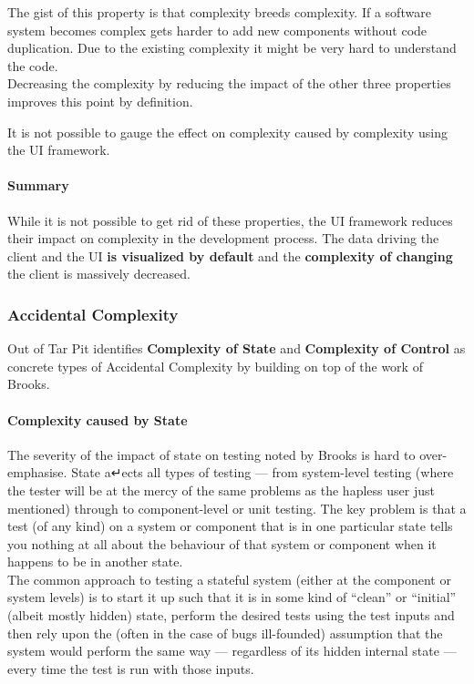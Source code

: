 The gist of this property is that complexity breeds complexity. If a software system becomes complex gets harder to add new components without code duplication. Due to the existing complexity it might be very hard to understand the code. \\ Decreasing the complexity by reducing the impact of the other three properties improves this point by definition.

It is not possible to gauge the effect on complexity caused by complexity using the UI framework.

\paragraph{Summary}
While it is not possible to get rid of these properties, the UI framework reduces their impact on complexity in the development process. The data driving the client and the UI \textbf{is visualized by default} and the \textbf{complexity of changing} the client is massively decreased.

\subsubsection{Accidental Complexity}
Out of Tar Pit identifies \textbf{Complexity of State} and \textbf{Complexity of Control} as concrete types of Accidental Complexity by building on top of the work of Brooks.

\paragraph{Complexity caused by State}
The severity of the impact of state on testing noted by Brooks is hard to over-emphasise. State a↵ects all types of testing — from system-level testing (where the tester will be at the mercy of the same problems as the hapless user just mentioned) through to component-level or unit testing. The key problem is that a test (of any kind) on a system or component that is in one particular state tells you nothing at all about the behaviour of that system or component when it happens to be in another state. \\
The common approach to testing a stateful system (either at the component or system levels) is to start it up such that it is in some kind of “clean” or “initial” (albeit mostly hidden) state, perform the desired tests using the test inputs and then rely upon the (often in the case of bugs ill-founded) assumption that the system would perform the same way — regardless of its hidden internal state — every time the test is run with those inputs. \citep{outoftarpit}

